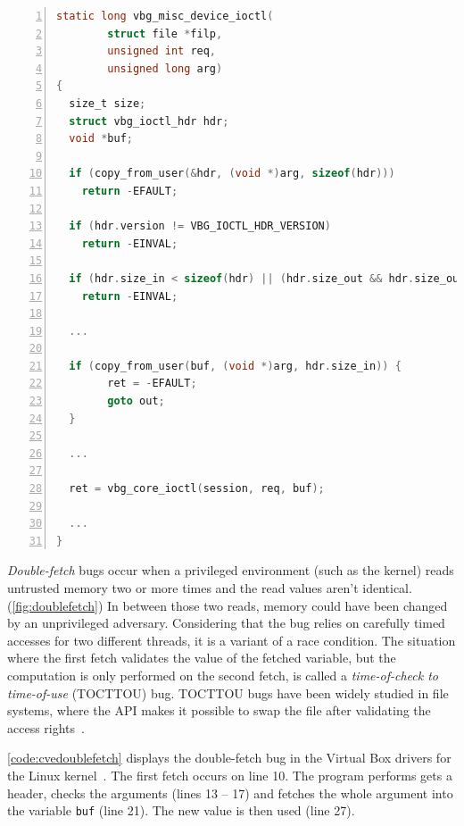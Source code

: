 \documentclass[conference]{IEEEtran}
\begin{document}
\begin{lstlisting}[language=C, caption=Abridged CVE-2018-12633 Double Fetch in Linux,
                  label=code:cvedoublefetch,  breaklines=true
                  postbreak=\mbox{\textcolor{red}{$\hookrightarrow$}\space},
                  numbers=left,basicstyle=\scriptsize, xleftmargin=5.0ex]
static long vbg_misc_device_ioctl(
        struct file *filp,
        unsigned int req,
        unsigned long arg)
{
  size_t size;
  struct vbg_ioctl_hdr hdr;
  void *buf;

  if (copy_from_user(&hdr, (void *)arg, sizeof(hdr))) 
    return -EFAULT;
  
  if (hdr.version != VBG_IOCTL_HDR_VERSION) 
    return -EINVAL;
   
  if (hdr.size_in < sizeof(hdr) || (hdr.size_out && hdr.size_out < sizeof(hdr)))
    return -EINVAL;
  
  ...
  
  if (copy_from_user(buf, (void *)arg, hdr.size_in)) {
		ret = -EFAULT;
		goto out;
  }

  ...

  ret = vbg_core_ioctl(session, req, buf);

  ...
}
\end{lstlisting}

\emph{Double-fetch} bugs occur when a privileged environment (such as the
kernel) reads untrusted memory two or more times and the read values aren't
identical. (\autoref{fig:doublefetch}) In between those two reads, memory could
have been changed by an unprivileged adversary. Considering that the bug relies
on carefully timed accesses for two different threads, it is a variant of a race
condition. The situation where the first fetch validates the value of the
fetched variable, but the computation is only performed on the second fetch, is
called a \emph{time-of-check to time-of-use} (TOCTTOU) bug. TOCTTOU bugs have
been widely studied in file systems, where the API makes it possible to swap the
file after validating the access rights~\cite{payer2012protecting,
pu2006methodical, wei2010modeling, tsafrir2008portably}.

\autoref{code:cvedoublefetch} displays the double-fetch bug in the Virtual Box
drivers for the Linux kernel~\cite{cve201812633}. The first fetch occurs on line
10. The program performs gets a header, checks the arguments (lines 13 -- 17)
and fetches the whole argument into the variable \texttt{buf} (line 21). The new
value is then used (line 27).
\end{document}
